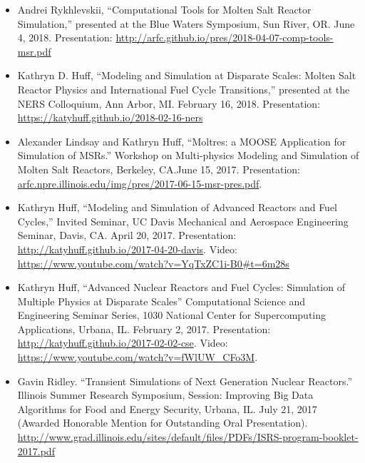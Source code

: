 \documentclass[letterpaper]{article}
\begin{document}
\begin{itemize} 
        \item Andrei Rykhlevskii, ``Computational Tools for Molten Salt Reactor 
                Simulation,'' presented at the Blue Waters Symposium, Sun 
                River, OR. June 4, 2018. Presentation: 
                \url{http://arfc.github.io/pres/2018-04-07-comp-tools-msr.pdf}
        \item Kathryn D. Huff, ``Modeling and Simulation at Disparate Scales: 
                Molten Salt Reactor Physics and International Fuel Cycle 
                Transitions,'' presented at the NERS Colloquium, Ann Arbor, MI. 
                February 16, 2018. Presentation: 
                \url{https://katyhuff.github.io/2018-02-16-ners}
        \item Alexander Lindsay and Kathryn Huff, ``Moltres: a MOOSE 
                Application for Simulation of MSRs.'' Workshop on Multi-physics 
                Modeling and Simulation of Molten Salt Reactors, Berkeley, 
                CA.June 15, 2017. Presentation: 
        \url{arfc.npre.illinois.edu/img/pres/2017-06-15-msr-pres.pdf}. 
        \item Kathryn Huff, ``Modeling and Simulation of Advanced Reactors and 
                Fuel Cycles,'' Invited Seminar, UC Davis Mechanical and 
                Aerospace Engineering Seminar, Davis, CA. April 20, 2017. 
                Presentation: \url{http://katyhuff.github.io/2017-04-20-davis}. 
                Video: 
                \url{https://www.youtube.com/watch?v=YqTxZC1i-B0#t=6m28s}
        \item Kathryn Huff, ``Advanced Nuclear Reactors and Fuel Cycles: 
                Simulation of Multiple Physics at Disparate Scales'' 
                Computational Science and Engineering Seminar Series, 1030 
                National Center for Supercomputing Applications, Urbana, IL. 
                February 2, 2017. Presentation: 
                \url{http://katyhuff.github.io/2017-02-02-cse}.  Video: 
                \url{https://www.youtube.com/watch?v=fWlUW_CFo3M}.
        \item Gavin Ridley. ``Transient Simulations of Next Generation Nuclear 
                Reactors.'' Illinois Summer Research Symposium, Session: 
                Improving Big Data Algorithms for Food and Energy Security, 
                Urbana, IL. July 21, 2017 (Awarded Honorable Mention for 
                Outstanding Oral Presentation). \url{http://www.grad.illinois.edu/sites/default/files/PDFs/ISRS-program-booklet-2017.pdf}
\end{itemize}
\end{document}
